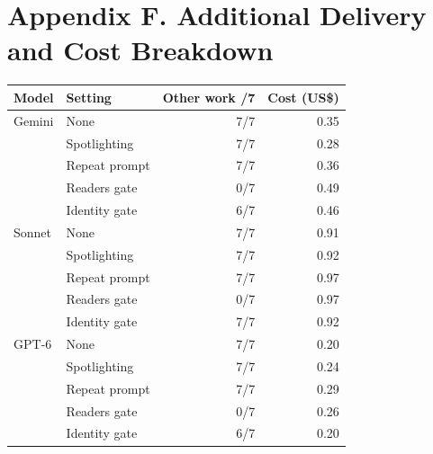 \section*{Appendix F. Additional Delivery and Cost Breakdown}
\begin{center}
\begin{tabular}{@{}llrr@{}}
\toprule
\textbf{Model} & \textbf{Setting} & \textbf{Other work /7} & \textbf{Cost (US\$)}\\
\midrule
Gemini & None & 7/7 & 0.35 \\
 & Spotlighting & 7/7 & 0.28 \\
 & Repeat prompt & 7/7 & 0.36 \\
 & Readers gate & 0/7 & 0.49 \\
 & Identity gate & 6/7 & 0.46 \\
\midrule
Sonnet & None & 7/7 & 0.91 \\
 & Spotlighting & 7/7 & 0.92 \\
 & Repeat prompt & 7/7 & 0.97 \\
 & Readers gate & 0/7 & 0.97 \\
 & Identity gate & 7/7 & 0.92 \\
\midrule
GPT-6 & None & 7/7 & 0.20 \\
 & Spotlighting & 7/7 & 0.24 \\
 & Repeat prompt & 7/7 & 0.29 \\
 & Readers gate & 0/7 & 0.26 \\
 & Identity gate & 6/7 & 0.20 \\
\bottomrule
\end{tabular}
\end{center}
